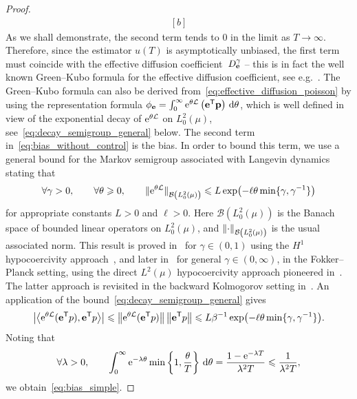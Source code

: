 \documentclass[11pt,a4paper]{article}
\begin{document}
\begin{proof}
\begin{equation}
\begin{aligned}[b]
\end{aligned}
\end{equation}
As we shall demonstrate, the second term tends to 0 in the limit as $T \to \infty$.
Therefore, since the estimator $u(T)$ is asymptotically unbiased,
the first term must coincide with the effective diffusion coefficient~$D^{\gamma}_{\boldsymbol{\mathbf e}}$
-- this is in fact the well known Green--Kubo formula for the effective diffusion coefficient, see e.g.~\cite{pavliotis2011applied,MR3509213}.
The Green--Kubo formula can also be derived from~\eqref{eq:effective_diffusion_poisson} by using the representation formula $\phi_{\boldsymbol{\mathbf e}} = \int_{0}^{\infty} \mathrm{e}^{\theta \mathcal L} \left(\boldsymbol{\mathbf e}^\mathsf T \boldsymbol{\mathbf p}\right) \, \mathrm d \theta$,
which is well defined in view of the exponential decay of $\mathrm{e}^{\theta \mathcal L}$ on $L^2_0(\mu)$,
see~\eqref{eq:decay_semigroup_general} below.
The second term in~\eqref{eq:bias_without_control} is the bias.
In order to bound this term,
we use a general bound for the Markov semigroup associated with Langevin dynamics
stating that
\begin{equation}
    \label{eq:decay_semigroup_general}
    \forall \gamma > 0, \qquad \forall \theta \geq 0, \qquad
    \norm*{ \e^{\theta \mathcal L} }[\mathcal B \left(L^2_0\left(\mu\right) \right)] \leq L \exp \bigl(- \ell \theta \min\{\gamma, \gamma^{-1}\} \bigr)
\end{equation}
for appropriate constants $L > 0$ and $\ell > 0$.
Here $\mathcal B\left(L^2_0(\mu)\right)$ is the Banach space of bounded linear operators on $L^2_0(\mu)$,
and $\norm{\cdot}_{\mathcal B\left(L^2_0(\mu)\right)}$ is the usual associated norm.
This result is proved in~\cite{MR2394704} for $\gamma \in (0, 1)$ using the $H^1$ hypocoercivity approach~\cite{MR2562709},
and later in~\cite{MR3106879} for general $\gamma \in (0, \infty)$, in the Fokker--Planck setting,
using the direct $L^2(\mu)$ hypocoercivity approach pioneered in~\cite{Herau06,MR2576899,MR3324910}.
The latter approach is revisited in the backward Kolmogorov setting in~\cite{MR3522857,roussel2018spectral}.
An application of the bound~\eqref{eq:decay_semigroup_general} gives
\begin{equation}
    \label{eq:initial_bound_velocity_autocorrelation}
    \left\lvert \ip{\e^{\theta \mathcal L}(\vect e^\t p)}{\vect e^\t p} \right\rvert
    \leq \norm{\e^{\theta \mathcal L}(\vect e^\t p)} \norm{\vect e^\t p}
    \leq L \beta^{-1} \exp\bigl(- \ell \theta \min\{\gamma, \gamma^{-1}\}\bigr).
\end{equation}
Noting that
\begin{equation}
    \label{eq:petit_calcul}
    \forall \lambda > 0, \qquad
    \int_{0}^{\infty} \mathrm{e}^{-\lambda \theta} \min\left\{ 1, \frac{\theta}{T} \right\} \, \mathrm d \theta
    = \frac{1 - \mathrm{e}^{- \lambda T}}{\lambda^2 T} \leqslant \frac{1}{\lambda^2 T},
\end{equation}
we obtain~\eqref{eq:bias_simple}.
\end{proof}
\end{document}
